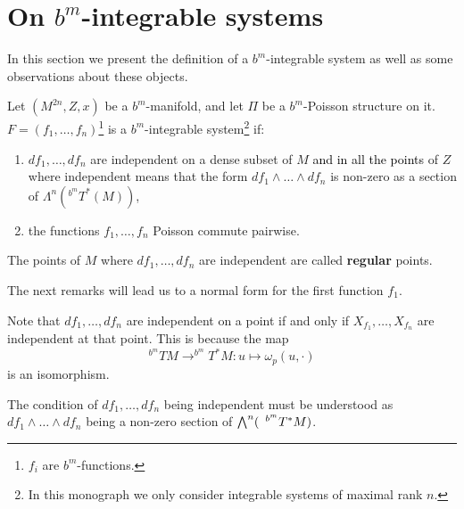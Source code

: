 %
%

\section{On $b^m$-integrable systems}

In this section we present the definition of a $b^m$-integrable system as well as some observations about these objects.

\begin{definition}
Let $(M^{2n},Z,x)$ be a $b^m$-manifold, and let $\Pi$ be a $b^m$-Poisson structure on it.
$F = (f_1, \ldots, f_n)$\footnote{$f_i$ are $b^m$-functions.} is a $b^m$-integrable system\footnote{ In this monograph we only consider integrable systems of maximal rank $n$.} if:

\begin{enumerate}%
\item $df_1,\ldots,df_n$ are independent on a dense subset of $M$ \textcolor{black}{and in all the points} of $Z$ where independent means that the form $df_1\wedge\ldots\wedge df_n$ is non-zero as a section of $\Lambda^n(^{b^m} T^{*}(M))$,
\item  the functions $f_1,\ldots, f_n$ Poisson commute pairwise.
\end{enumerate}
\end{definition}


\begin{definition}
 The points of $M$ where $df_1,\ldots, df_n$ are independent  are called \textbf{regular} points.
\end{definition}


The next remarks will lead us to a normal form for the first function $f_1$.
\begin{remark}\label{independence}
Note that $df_1,\ldots, df_n$ are independent on a point if and only if $X_{f_1},\ldots,X_{f_n}$ are independent at that point. This is because the map
$$^{b^m}TM \rightarrow ^{b^m}T^*M:u\mapsto \omega_p(u,\cdot)$$
is an isomorphism.
\end{remark}

\begin{remark}
The condition of $d f_1, \ldots, d f_n$ being independent must be understood as $d f_1 \wedge \ldots \wedge df_n$ being a non-zero section of $\bigwedge^n (\enskip ^{b^m}T^*M)$.

\end{remark}

